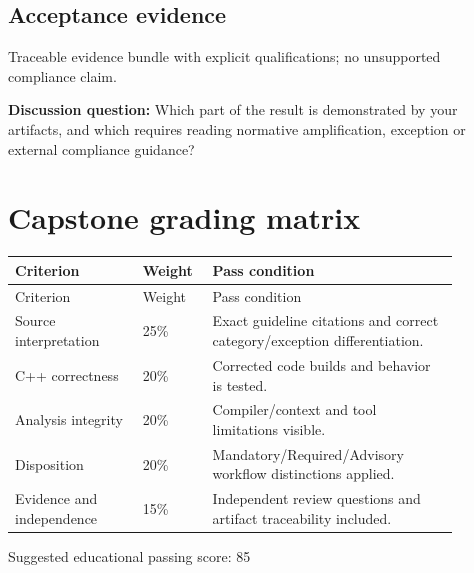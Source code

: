 \documentclass[10pt,letterpaper]{article}
\begin{document}
\subsection{Acceptance evidence}
Traceable evidence bundle with explicit qualifications; no unsupported compliance claim.

\textbf{Discussion question:} Which part of the result is demonstrated by your artifacts, and which requires reading normative amplification, exception or external compliance guidance?\par

\section{Capstone grading matrix}
\small\setlength{\tabcolsep}{3pt}\renewcommand{\arraystretch}{1.15}
\begin{longtable}{p{0.26\linewidth}p{0.12\linewidth}p{0.5\linewidth}}
\toprule
Criterion & Weight & Pass condition\\ \midrule
\endfirsthead
\toprule
Criterion & Weight & Pass condition\\ \midrule
\endhead
Source interpretation & 25\% & Exact guideline citations and correct category/exception differentiation.\\
C++ correctness & 20\% & Corrected code builds and behavior is tested.\\
Analysis integrity & 20\% & Compiler/context and tool limitations visible.\\
Disposition & 20\% & Mandatory/Required/Advisory workflow distinctions applied.\\
Evidence and independence & 15\% & Independent review questions and artifact traceability included.\\
\bottomrule
\end{longtable}
\normalsize
Suggested educational passing score: 85%
\end{document}
